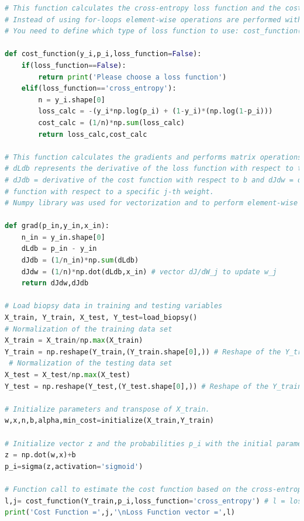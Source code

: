 \documentclass{article}
\begin{document}
\begin{lstlisting}[language=Python]
# This function calculates the cross-entropy loss function and the cost function. 
# Instead of using for-loops element-wise operations are performed with arrays. 
# You need to define which type of loss function to use: cost_function(y_train,p_i,loss_function='cross_entropy')
 
def cost_function(y_i,p_i,loss_function=False): 
    if(loss_function==False):
        return print('Please choose a loss function')
    elif(loss_function=='cross_entropy'):
        n = y_i.shape[0]
        loss_calc = -(y_i*np.log(p_i) + (1-y_i)*(np.log(1-p_i)))
        cost_calc = (1/n)*np.sum(loss_calc)
        return loss_calc,cost_calc

# This function calculates the gradients and performs matrix operations to estimate the partial derivatives. 
# dLdb represents the derivative of the loss function with respect to the offset parameter b. 
# dJdb = derivative of the cost function with respect to b and dJdw = derivative of the cost 
# function with respect to a specific j-th weight. 
# Numpy library was used for vectorization and to perform element-wise operations instead of for loops.  

def grad(p_in,y_in,x_in):
    n_in = y_in.shape[0]
    dLdb = p_in - y_in
    dJdb = (1/n_in)*np.sum(dLdb)  
    dJdw = (1/n)*np.dot(dLdb,x_in) # vector dJ/dW_j to update w_j
    return dJdw,dJdb
    
# Load biopsy data in training and testing variables
X_train, Y_train, X_test, Y_test=load_biopsy() 
# Normalization of the training data set 
X_train = X_train/np.max(X_train)  
Y_train = np.reshape(Y_train,(Y_train.shape[0],)) # Reshape of the Y_train from (300, 1) to (300,)
 # Normalization of the testing data set
X_test = X_test/np.max(X_test)
Y_test = np.reshape(Y_test,(Y_test.shape[0],)) # Reshape of the Y_train from (300, 1) to (300,)

# Initialize parameters and transpose of X_train.
w,x,n,b,alpha,min_cost=initialize(X_train,Y_train)

# Initialize vector z and the probabilities p_i with the initial parameter of the model
z = np.dot(w,x)+b
p_i=sigma(z,activation='sigmoid')

# Function call to estimate the cost function based on the cross-entropy loss function and print both the cost function and the loss function. l = loss function, j = cost function
l,j= cost_function(Y_train,p_i,loss_function='cross_entropy') # l = loss function
print('Cost Function =',j,'\nLoss Function vector =',l)
 

\end{lstlisting}
\end{document}
